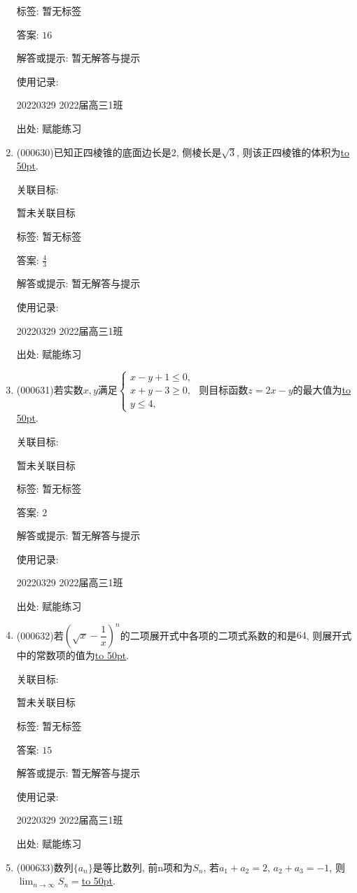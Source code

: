 \documentclass[10pt,a4paper]{article}
\newcommand{\blank}[1]{\underline{\hbox to #1pt{}}}
\begin{document}
\begin{enumerate}[1.]
标签: 暂无标签

答案: $16$

解答或提示: 暂无解答与提示

使用记录:

20220329	2022届高三1班	


出处: 赋能练习
\item { (000630)}已知正四棱锥的底面边长是$2$, 侧棱长是$\sqrt3$, 则该正四棱锥的体积为\blank{50}.


关联目标:

暂未关联目标



标签: 暂无标签

答案: $\frac 43$

解答或提示: 暂无解答与提示

使用记录:

20220329	2022届高三1班	


出处: 赋能练习
\item { (000631)}若实数$x,y$满足$\begin{cases} x-y+1 \le 0, \\ x+y-3 \ge 0, \\ y\le 4,\end{cases}$ 则目标函数$z=2x-y$的最大值为\blank{50}.


关联目标:

暂未关联目标



标签: 暂无标签

答案: $2$

解答或提示: 暂无解答与提示

使用记录:

20220329	2022届高三1班	


出处: 赋能练习
\item { (000632)}若$(\sqrt x-\dfrac1x)^n$的二项展开式中各项的二项式系数的和是$64$, 则展开式中的常数项的值为\blank{50}.


关联目标:

暂未关联目标



标签: 暂无标签

答案: $15$

解答或提示: 暂无解答与提示

使用记录:

20220329	2022届高三1班	


出处: 赋能练习
\item { (000633)}数列$\{a_n\}$是等比数列, 前n项和为$S_n$, 若$a_1+a_2=2$, $a_2+a_3=-1$, 则$\displaystyle\lim_{n\to\infty}{S_n}=$\blank{50}.



\end{enumerate}
\end{document}
